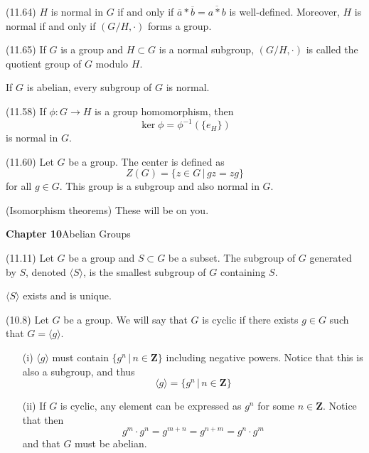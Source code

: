 \begin{thm}
(11.64) $H$ is normal in $G$ if and only if $\overline{a}* \overline{b}=\overline{a*b}$ is well-defined. Moreover, $H$ is normal if and only if $(G/H,\cdot )$ forms a group. 
\end{thm}
\vspace{2ex}
\begin{defi}
(11.65) If $G$ is a group and $H\subset G$ is a normal subgroup, $(G/H,\cdot )$ is called the quotient group of $G$ modulo $H$.
\end{defi}
\vspace{2ex}
\begin{rmk}
If $G$ is abelian, every subgroup of $G$ is normal.
\end{rmk}
\vspace{2ex}
\begin{prop}
(11.58) If $\phi :G\rightarrow H$ is a group homomorphism, then
\[\mathop{\mathrm{ker}}\phi =\phi ^{-1}(\{e_{H}\})\]
is normal in $G$.
\end{prop}
\vspace{2ex}
\begin{ex}
(11.60) Let $G$ be a group. The center is defined as
\[Z(G)=\{z\in G \,|\, gz=zg\}\]
for all $g\in G$. This group is a subgroup and also normal in $G$.
\end{ex}
\vspace{2ex}
\begin{thm}
(Isomorphism theorems) These will be on you. 
\end{thm}
\vspace{2ex}
{\bf Chapter 10}\hspace{2ex}Abelian Groups
\newline
\begin{defi}
(11.11) Let $G$ be a group and $S\subset G$ be a subset. The subgroup of $G$ generated by $S$, denoted $\langle S\rangle $, is the smallest subgroup of $G$ containing $S$. 
\end{defi}
\vspace{2ex}
\begin{rmk}
$\langle S\rangle $ exists and is unique.
\end{rmk}
\vspace{2ex}
\begin{defi}
(10.8) Let $G$ be a group. We will say that $G$ is cyclic if there exists $g\in G$ such that $G=\langle g\rangle $.
\end{defi}
\vspace{2ex}
\begin{rmk}
\begin{itemize}
\item[(i)] $\langle g\rangle $ must contain $\{g^{n} \,|\, n\in {\bm Z}\}$ including negative powers. Notice that this is also a subgroup, and thus 
\[\langle g\rangle =\{g^{n} \,|\, n\in {\bm Z}\}\]
\item[(ii)] If $G$ is cyclic, any element can be expressed as $g^{n}$ for some $n\in {\bm Z}$. Notice that then 
\[g^{m}\cdot g^{n}=g^{m+n}=g^{n+m}=g^{n}\cdot g^{m}\]
and that $G$ must be abelian.
\end{itemize}
\end{rmk}
